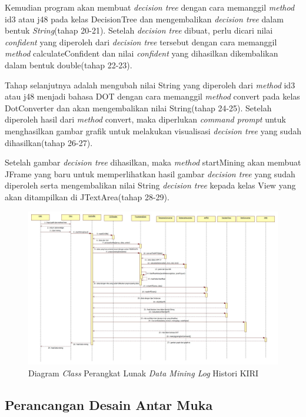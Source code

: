 Kemudian program akan membuat \textsl{decision tree} dengan cara memanggil \textsl{method} id3 atau j48 pada kelas DecisionTree dan mengembalikan \textsl{decision tree} dalam bentuk \textsl{String}(tahap 20-21). Setelah \textsl{decision tree} dibuat, perlu dicari nilai \textsl{confident} yang diperoleh dari \textsl{decision tree} tersebut dengan cara memanggil \textsl{method} calculateConfident dan nilai \textsl{confident} yang dihasilkan dikembalikan dalam bentuk double(tahap 22-23).

Tahap selanjutnya adalah mengubah nilai String yang diperoleh dari \textsl{method} id3 atau j48 menjadi bahasa DOT dengan cara memanggil \textsl{method} convert pada kelas DotConverter dan akan mengembalikan nilai String(tahap 24-25). Setelah diperoleh hasil dari \textsl{method} convert, maka diperlukan \textsl{command prompt} untuk menghasilkan gambar grafik untuk melakukan visualisasi \textsl{decision tree} yang sudah dihasilkan(tahap 26-27).

Setelah gambar \textsl{decision tree} dihasilkan, maka \textsl{method} startMining akan membuat JFrame yang baru untuk memperlihatkan hasil gambar \textsl{decision tree} yang sudah diperoleh serta mengembalikan nilai String \textsl{decision tree} kepada kelas View yang akan ditampilkan di JTextArea(tahap 28-29).


\begin{figure}[H]
\includegraphics[scale=0.42, angle =90]{Gambar/sequenceDiagram.jpg}
\caption[Diagram \textsl{Class} Perangkat Lunak \textsl{Data Mining Log} Histori KIRI]{Diagram \textsl{Class} Perangkat Lunak \textsl{Data Mining Log} Histori KIRI} 
\label{fig:sequenceDiagram}
\end{figure}

\subsection{Perancangan Desain Antar Muka}

